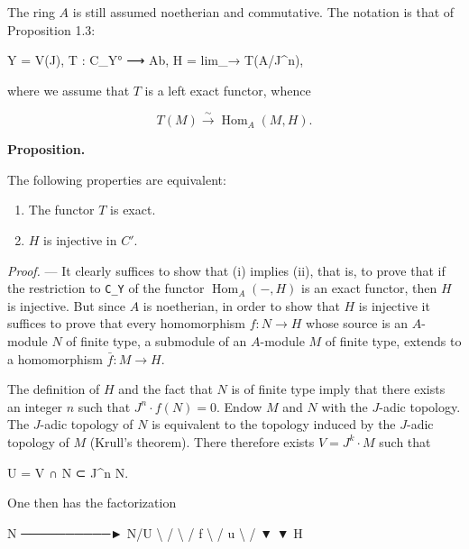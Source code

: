 \documentclass[
  11pt,
  a4paper,
]{book}
\newenvironment{Shaded}{}{}
\newcommand{\NormalTok}[1]{#1}
\providecommand{\tightlist}{%
  \setlength{\itemsep}{0pt}\setlength{\parskip}{0pt}}
\begin{document}
The ring \(A\) is still assumed noetherian and commutative. The notation
is that of Proposition 1.3:

\begin{Shaded}
\begin{Highlighting}[]
\NormalTok{Y = V(J),    T : C\_Y° ⟶ Ab,    H = lim\_→ T(A/J\^{}n),}
\end{Highlighting}
\end{Shaded}

where we assume that \(T\) is a left exact functor, whence

\[ T(M) \xrightarrow{\sim} \operatorname{Hom}_{A}(M, H). \]

\textbf{Proposition.}

The following properties are equivalent:

\begin{enumerate}
\def\labelenumi{\arabic{enumi}.}
\tightlist
\item
  The functor \(T\) is exact.
\item
  \(H\) is injective in \(C'\).
\end{enumerate}

\emph{Proof.} --- It clearly suffices to show that (i) implies (ii),
that is, to prove that if the restriction to \texttt{C\_Y} of the
functor \(\operatorname{Hom}_{A}(-, H)\) is an exact functor, then \(H\)
is injective. But since \(A\) is noetherian, in order to show that \(H\)
is injective it suffices to prove that every homomorphism
\(f : N \to H\) whose source is an \(A\)-module \(N\) of finite type, a
submodule of an \(A\)-module \(M\) of finite type, extends to a
homomorphism \(\bar{f} : M \to H\).

The definition of \(H\) and the fact that \(N\) is of finite type imply
that there exists an integer \(n\) such that \(J^{n}
\cdot f(N) = 0\). Endow \(M\) and \(N\) with the \(J\)-adic topology.
The \(J\)-adic topology of \(N\) is equivalent to the topology induced
by the \(J\)-adic topology of \(M\) (Krull's theorem). There therefore
exists \(V = J^{k} \cdot M\) such that

\begin{Shaded}
\begin{Highlighting}[]
\NormalTok{U = V ∩ N ⊂ J\^{}n N.}
\end{Highlighting}
\end{Shaded}

One then has the factorization

\begin{Shaded}
\begin{Highlighting}[]
\NormalTok{N ──────────► N/U}
\NormalTok{ \textbackslash{}           /}
\NormalTok{  \textbackslash{}         /}
\NormalTok{ f \textbackslash{}       / u}
\NormalTok{    \textbackslash{}     /}
\NormalTok{     ▼   ▼}
\NormalTok{       H}
\end{Highlighting}
\end{Shaded}
\end{document}
